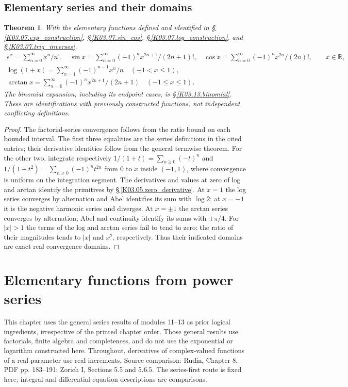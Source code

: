 \documentclass[11pt,oneside,a4paper]{book}
\newtheorem{theorem}{Theorem}[chapter]
\theoremstyle{definition}
\theoremstyle{remark}
\newcommand{\R}{\mathbb R}
\newcommand{\abs}[1]{\lvert#1\rvert}
\newcommand{\KEntry}[2]{\Needspace{7\baselineskip}\section{#2}\label{#1}{\small\sffamily\color{black!60}\detokenize{#1}}\par}
\newcommand{\KRef}[1]{\hyperref[#1]{\S\,\ref*{#1}}}
\newcommand{\SourceRef}[1]{{\small\textsf{Source comparison: #1.}}}
\begin{document}
\KEntry{K03.13.standard_series}{Elementary series and their domains}
\begin{theorem}
With the elementary functions defined and identified in \KRef{K03.07.exp_construction}, \KRef{K03.07.sin_cos}, \KRef{K03.07.log_construction}, and \KRef{K03.07.trig_inverses},
\[\begin{gathered}
e^x=\sum_{n=0}^\infty x^n/n!,\quad
\sin x=\sum_{n=0}^\infty(-1)^n x^{2n+1}/(2n+1)!,\quad
\cos x=\sum_{n=0}^\infty(-1)^n x^{2n}/(2n)!,\qquad x\in\R,\\
\log(1+x)=\sum_{n=1}^\infty(-1)^{n-1}x^n/n\quad(-1<x\leq1),\\
\arctan x=\sum_{n=0}^\infty(-1)^nx^{2n+1}/(2n+1)\quad(-1\leq x\leq1).
\end{gathered}\]
The binomial expansion, including its endpoint cases, is \KRef{K03.13.binomial}. These are identifications with previously constructed functions, not independent conflicting definitions.
\end{theorem}
\begin{proof}
The factorial-series convergence follows from the ratio bound on each bounded interval. The first three equalities are the series definitions in the cited entries; their derivative identities follow from the general termwise theorem. For the other two, integrate respectively $1/(1+t)=\sum_{n\geq0}(-t)^n$ and $1/(1+t^2)=\sum_{n\geq0}(-1)^nt^{2n}$ from $0$ to $x$ inside $(-1,1)$, where convergence is uniform on the integration segment. The derivatives and values at zero of log and arctan identify the primitives by \KRef{K03.05.zero_derivative}. At $x=1$ the log series converges by alternation and Abel identifies its sum with $\log2$; at $x=-1$ it is the negative harmonic series and diverges. At $x=\pm1$ the arctan series converges by alternation; Abel and continuity identify its sums with $\pm\pi/4$. For $\abs x>1$ the terms of the log and arctan series fail to tend to zero: the ratio of their magnitudes tends to $\abs x$ and $x^2$, respectively. Thus their indicated domains are exact real convergence domains.
\end{proof}



\chapter{Elementary functions from power series}
This chapter uses the general series results of modules 11--13 as prior logical
ingredients, irrespective of the printed chapter order. Those general results
use factorials, finite algebra and completeness, and do not use the exponential
or logarithm constructed here. Throughout, derivatives of complex-valued
functions of a real parameter use real increments.
\SourceRef{Rudin, Chapter 8, PDF pp. 183--191; Zorich I, Sections 5.5 and 5.6.5. The series-first route is fixed here; integral and differential-equation descriptions are comparisons}
\end{document}
